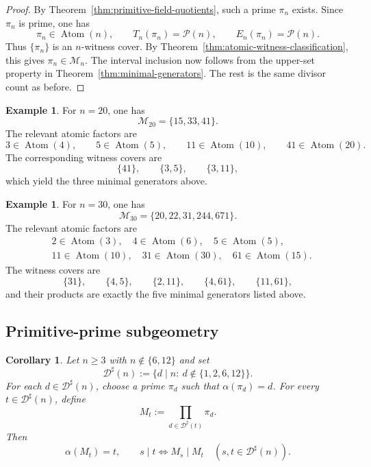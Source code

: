 \documentclass[11pt,letterpaper]{article}
\numberwithin{equation}{section}
\theoremstyle{plain}
\newtheorem{corollary}[theorem]{Corollary}
\theoremstyle{definition}
\newtheorem{example}[theorem]{Example}
\theoremstyle{remark}
\DeclareMathOperator{\Atom}{Atom}
\begin{document}
\begin{proof}
By Theorem~\ref{thm:primitive-field-quotients}, such a prime $\pi_n$ exists.
Since $\pi_n$ is prime, one has
\[
\pi_n\in \Atom(n),
\qquad
T_n(\pi_n)=\mathcal P(n),
\qquad
E_n(\pi_n)=\mathcal P(n).
\]
Thus $\{\pi_n\}$ is an $n$-witness cover. By
Theorem~\ref{thm:atomic-witness-classification}, this gives
$\pi_n\in\mathcal M_n$. The interval inclusion now follows from the upper-set
property in Theorem~\ref{thm:minimal-generators}. The rest is the same divisor
count as before.
\end{proof}

\begin{example}
\label{ex:witness-cover-n20}
For $n=20$, one has
\[
\mathcal M_{20}=\{15,33,41\}.
\]
The relevant atomic factors are
\[
3\in \Atom(4),\qquad
5\in \Atom(5),\qquad
11\in \Atom(10),\qquad
41\in \Atom(20).
\]
The corresponding witness covers are
\[
\{41\},\qquad \{3,5\},\qquad \{3,11\},
\]
which yield the three minimal generators above.
\end{example}

\begin{example}
\label{ex:witness-cover-n30}
For $n=30$, one has
\[
\mathcal M_{30}=\{20,22,31,244,671\}.
\]
The relevant atomic factors are
\[
\begin{aligned}
&2\in \Atom(3),\quad
4\in \Atom(6),\quad
5\in \Atom(5),\\
&11\in \Atom(10),\quad
31\in \Atom(30),\quad
61\in \Atom(15).
\end{aligned}
\]
The witness covers are
\[
\{31\},\qquad
\{4,5\},\qquad
\{2,11\},\qquad
\{4,61\},\qquad
\{11,61\},
\]
and their products are exactly the five minimal generators listed above.
\end{example}

\subsection*{Primitive-prime subgeometry}

\begin{corollary}
\label{thm:divisor-lattice-lift}
Let $n\ge 3$ with $n\notin\{6,12\}$ and set
\[
\mathcal D^\sharp(n):=\{d\mid n:\ d\notin\{1,2,6,12\}\}.
\]
For each $d\in \mathcal D^\sharp(n)$, choose a prime $\pi_d$ such that
$\alpha(\pi_d)=d$. For every $t\in \mathcal D^\sharp(n)$, define
\[
M_t:=\prod_{d\in \mathcal D^\sharp(t)} \pi_d.
\]
Then
\[
\alpha(M_t)=t,
\qquad
s\mid t \Longleftrightarrow M_s\mid M_t
\quad (s,t\in \mathcal D^\sharp(n)).
\]
\end{corollary}
\end{document}
